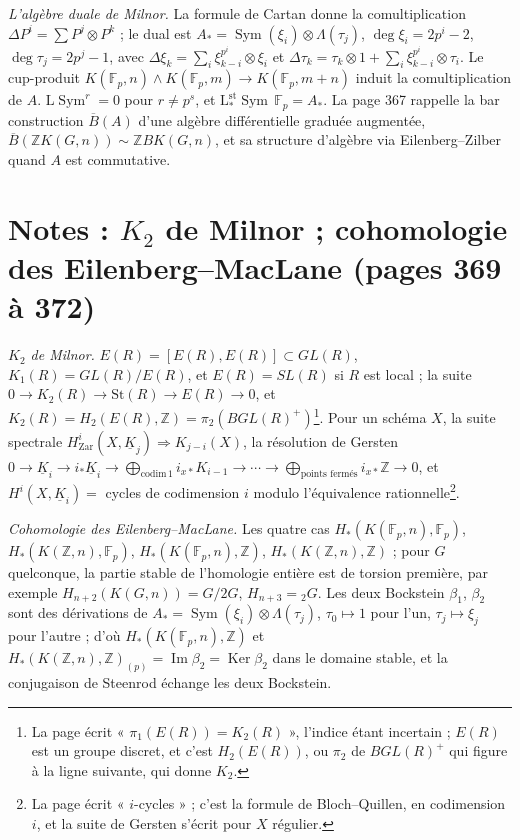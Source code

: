 \documentclass[11pt,a4paper]{article}
\begin{document}
\emph{L'algèbre duale de Milnor.} La formule de Cartan donne la comultiplication
$\Delta P^i = \sum P^j \otimes P^k$ ; le dual est $A_* = \operatorname{Sym}(\xi_i)
\otimes \Lambda(\tau_j)$, $\deg\xi_i = 2p^i - 2$, $\deg\tau_j = 2p^j - 1$, avec
$\Delta\xi_k = \sum_i \xi_{k-i}^{p^i} \otimes \xi_i$ et $\Delta\tau_k = \tau_k
\otimes 1 + \sum_i \xi_{k-i}^{p^i} \otimes \tau_i$. Le cup-produit $K(\mathbb{F}_p,
n) \wedge K(\mathbb{F}_p, m) \to K(\mathbb{F}_p, m+n)$ induit la comultiplication
de $A$. $\mathrm{L}\operatorname{Sym}^r = 0$ pour $r \neq p^s$, et
$\mathrm{L}^{\mathrm{st}}_*\operatorname{Sym}\,\mathbb{F}_p = A_*$. La page 367
rappelle la bar construction $\overline{B}(A)$ d'une algèbre différentielle
graduée augmentée, $\overline{B}(\mathbb{Z}K(G,n)) \sim \mathbb{Z}BK(G,n)$, et sa
structure d'algèbre via Eilenberg–Zilber quand $A$ est commutative.

\section*{Notes : $K_2$ de Milnor ; cohomologie des Eilenberg--MacLane (pages 369 à 372)}

\emph{$K_2$ de Milnor.} $E(R) = [E(R), E(R)] \subset GL(R)$, $K_1(R) = GL(R)/E(R)$,
et $E(R) = SL(R)$ si $R$ est local ; la suite $0 \to K_2(R) \to \mathrm{St}(R) \to
E(R) \to 0$, et $K_2(R) = H_2(E(R), \mathbb{Z}) = \pi_2(BGL(R)^+)$\footnote{La page
écrit « $\pi_1(E(R)) = K_2(R)$ », l'indice étant incertain ; $E(R)$ est un
groupe discret, et c'est $H_2(E(R))$, ou $\pi_2$ de $BGL(R)^+$ qui figure à la
ligne suivante, qui donne $K_2$.}. Pour un schéma $X$, la suite spectrale
$H^i_{\mathrm{Zar}}(X, \underline{K}_j) \Rightarrow K_{j-i}(X)$, la résolution de
Gersten $0 \to \underline{K}_i \to i_*\underline{K}_i \to \bigoplus_{\mathrm{codim}\,1}
i_{x*}K_{i-1} \to \cdots \to \bigoplus_{\text{points fermés}} i_{x*}\mathbb{Z}
\to 0$, et $H^i(X, \underline{K}_i) = $ cycles de codimension $i$ modulo
l'équivalence rationnelle\footnote{La page écrit « $i$-cycles » ; c'est la formule
de Bloch–Quillen, en codimension $i$, et la suite de Gersten s'écrit pour $X$
régulier.}.

\emph{Cohomologie des Eilenberg–MacLane.} Les quatre cas $H_*(K(\mathbb{F}_p, n),
\mathbb{F}_p)$, $H_*(K(\mathbb{Z},n), \mathbb{F}_p)$, $H_*(K(\mathbb{F}_p,n),
\mathbb{Z})$, $H_*(K(\mathbb{Z},n),\mathbb{Z})$ ; pour $G$ quelconque, la partie
stable de l'homologie entière est de torsion première, par exemple
$H_{n+2}(K(G,n)) = G/2G$, $H_{n+3} = {}_2G$. Les deux Bockstein $\beta_1$, $\beta_2$
sont des dérivations de $A_* = \operatorname{Sym}(\xi_i) \otimes \Lambda(\tau_j)$,
$\tau_0 \mapsto 1$ pour l'un, $\tau_j \mapsto \xi_j$ pour l'autre ; d'où
$H_*(K(\mathbb{F}_p, n), \mathbb{Z})$ et $H_*(K(\mathbb{Z},n), \mathbb{Z})_{(p)}
= \operatorname{Im}\beta_2 = \operatorname{Ker}\beta_2$ dans le domaine stable,
et la conjugaison de Steenrod échange les deux Bockstein.
\end{document}
